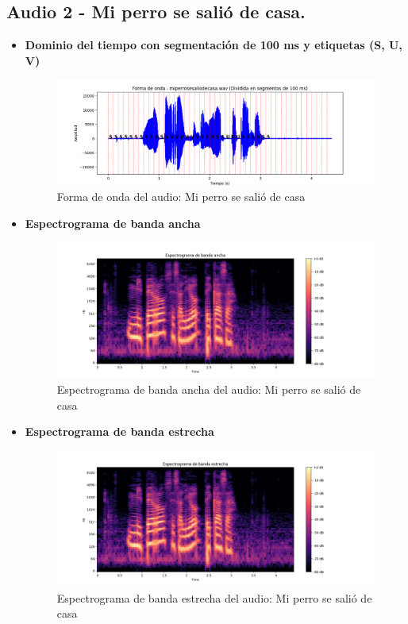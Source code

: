 \documentclass{report}
\begin{document}
\subsection{Audio 2 - Mi perro se salió de casa.}
\begin{itemize}
    \item \textbf{Dominio del tiempo con segmentación de 100 ms y etiquetas (S, U, V)}
    \begin{figure}[h]
        \centering
        \includegraphics[width=\linewidth]{a2.png}
        \caption{Forma de onda del audio: Mi perro se salió de casa}
        \label{fig:forma_onda_audio2div}
    \end{figure}
    \item \textbf{Espectrograma de banda ancha}
    \begin{figure}[h]
        \centering
        \includegraphics[width=\linewidth]{ancha2.png}
        \caption{Espectrograma de banda ancha del audio: Mi perro se salió de casa}
        \label{fig:espectograma banda ancha audio1}
    \end{figure}
    \newpage
    \item \textbf{Espectrograma de banda estrecha}
    \begin{figure}[h]
        \centering
        \includegraphics[width=\linewidth]{estrecha2.png}
        \caption{Espectrograma de banda estrecha del audio: Mi perro se salió de casa}
        \label{fig:espectograma banda estrecha audio1}
    \end{figure}
\end{itemize}
\newpage
\end{document}
